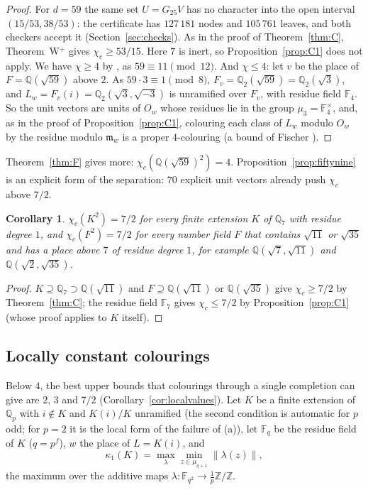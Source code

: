 \documentclass[11pt,a4paper]{amsart}
\newtheorem{corollary}{Corollary}
\theoremstyle{remark}
\newcommand{\Q}{\mathbb{Q}}
\newcommand{\Z}{\mathbb{Z}}
\newcommand{\F}{\mathbb{F}}
\begin{document}
\begin{proof}
For $d=59$ the same set $U=G_{25}V$ has no character into the open interval $(15/53,38/53)$: the certificate has
$127\,181$ nodes and $105\,761$ leaves, and both checkers accept it (Section~\ref{sec:checks}). As in the proof of
Theorem~\ref{thm:C}, Theorem~W$^+$ gives $\chi_c\ge53/15$. Here $7$ is inert, so Proposition~\ref{prop:C1} does not
apply. We have $\chi\ge4$ by \cite[Theorem~1]{FC}, as $59\equiv11\pmod{12}$. And $\chi\le4$: let $v$ be the place
of $F=\Q(\sqrt{59})$ above $2$. As $59\cdot3\equiv1\pmod8$, $F_v=\Q_2(\sqrt{59})=\Q_2(\sqrt3)$, and
$L_w=F_v(i)=\Q_2(\sqrt3,\sqrt{-3})$ is unramified over $F_v$, with residue field $\F_4$. So the unit vectors are
units of $O_w$ whose residues lie in the group $\mu_3=\F_4^\times$, and, as in the proof of
Proposition~\ref{prop:C1}, colouring each class of $L_w$ modulo $O_w$ by the residue modulo $\mathfrak m_w$ is a
proper $4$-colouring (a bound of Fischer \cite{Fischer1990}).
\end{proof}

Theorem~\ref{thm:F} gives more: $\chi_c(\Q(\sqrt{59})^2)=4$. Proposition~\ref{prop:fiftynine} is an explicit form of
the separation: $70$ explicit unit vectors already push $\chi_c$ above $7/2$.

\begin{corollary}\label{cor:sevenhalves}
$\chi_c(K^2)=7/2$ for every finite extension $K$ of $\Q_7$ with residue degree $1$, and $\chi_c(F^2)=7/2$ for every
number field $F$ that contains $\sqrt{11}$ or $\sqrt{35}$ and has a place above $7$ of residue degree $1$, for example
$\Q(\sqrt7,\sqrt{11})$ and $\Q(\sqrt2,\sqrt{35})$.
\end{corollary}

\begin{proof}
$K\supseteq\Q_7\supset\Q(\sqrt{11})$ and $F\supseteq\Q(\sqrt{11})$ or $\Q(\sqrt{35})$ give $\chi_c\ge7/2$ by
Theorem~\ref{thm:C}; the residue field $\F_7$ gives $\chi_c\le7/2$ by Proposition~\ref{prop:C1} (whose proof
applies to $K$ itself).
\end{proof}

\subsection*{Locally constant colourings}
Below $4$, the best upper bounds that colourings through a single completion can give are $2$, $3$ and $7/2$
(Corollary~\ref{cor:localvalues}). Let
$K$ be a finite extension of $\Q_p$ with $i\notin K$ and $K(i)/K$ unramified (the second condition is automatic for $p$ odd;
for $p=2$ it is the local form of the failure of (a)), let $\F_q$ be the residue field of $K$ ($q=p^f$), $w$ the place of $L=K(i)$, and
\[
\kappa_1(K)=\max_\lambda\min_{z\in\mu_{q+1}}\|\lambda(z)\|,
\]
the maximum over the additive maps $\lambda:\F_{q^2}\to\frac1p\Z/\Z$.
\end{document}
